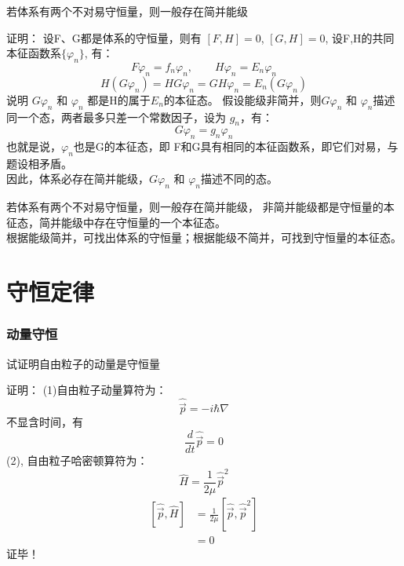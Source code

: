\begin{frame} [allowframebreaks=]
    \frametitle{} 
    \begin{tcolorbox}[colback=yellow!5,colframe=yellow!75!black,title=性质2：]
        若体系有两个不对易守恒量，则一般存在简并能级
    \end{tcolorbox}
    \alert{证明：} 设F、G都是体系的守恒量，则有 $[F,H]=0$, $[G,H]=0$, 设F,H的共同本征函数系$\{\varphi_n\}$, 有：\\ 
    $$F\varphi_n =f_n \varphi_n, \qquad H\varphi_n =E_n \varphi_n $$
    $$H(G\varphi_n) =HG\varphi_n=GH\varphi_n= E_n (G\varphi_n)$$
    说明 $G\varphi_n$ 和 $\varphi_n$ 都是H的属于$E_n$的本征态。
    假设能级非简并，则$G\varphi_n$ 和 $\varphi_n$描述同一个态，两者最多只差一个常数因子，设为 $g_n$，有：
    $$G\varphi_n=g_n \varphi_n$$
    也就是说，$\varphi_n$也是G的本征态，即 F和G具有相同的本征函数系，即它们对易，与题设相矛盾。\\
    因此，体系必存在简并能级，$G\varphi_n$ 和 $\varphi_n$描述不同的态。
    \begin{tcolorbox}[colback=yellow!5,colframe=yellow!75!black,title=推论：]
        若体系有两个不对易守恒量，则一般存在简并能级， 非简并能级都是守恒量的本征态，简并能级中存在守恒量的一个本征态。\\
        根据能级简并，可找出体系的守恒量；根据能级不简并，可找到守恒量的本征态。
    \end{tcolorbox}
\end{frame}

\section{守恒定律}

\begin{frame} [allowframebreaks=]
    \frametitle{动量守恒} 
    \begin{tcolorbox}[colback=yellow!5,colframe=yellow!75!black,title=动量守恒：]
        试证明自由粒子的动量是守恒量                                   
    \end{tcolorbox}
    \alert{证明：} (1)自由粒子动量算符为：
    $$ \hat{\vec{p}} = -i\hbar\nabla  $$
    不显含时间，有 $$\frac{d}{dt}\hat{\vec{p}}=0$$ 
    (2), 自由粒子哈密顿算符为： $$ \hat{H} = \frac{1}{2\mu} \hat{\vec{p}}^2 $$
    $$\begin{aligned}
        [\hat{\vec{p}},\hat{H}]&= \frac{1}{2\mu}[\hat{\vec{p}}, \hat{\vec{p}}^2 ] \\
        &= 0
    \end{aligned}$$
    证毕！
\end{frame}

